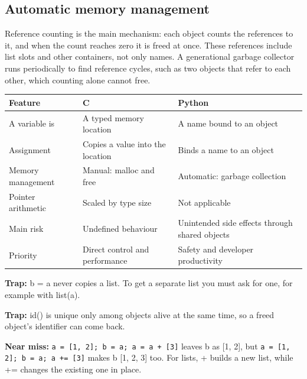 \documentclass[11pt]{article}
\begin{document}
\begin{keepsection}
\begin{keepsection}
\subsection{Automatic memory management}

Reference counting is the main mechanism: each object counts the references to it, and when the count reaches zero it is freed at once. These references include list slots and other containers, not only names. A generational garbage collector runs periodically to find reference cycles, such as two objects that refer to each other, which counting alone cannot free.

\begin{center}\small\begin{tabularx}{\linewidth}{>{\raggedright\arraybackslash}X>{\raggedright\arraybackslash}X>{\raggedright\arraybackslash}X}\toprule
\textbf{Feature} & \textbf{C} & \textbf{Python} \\ \midrule
A variable is & A typed memory location & A name bound to an object \\
Assignment & Copies a value into the location & Binds a name to an object \\
Memory management & Manual: malloc and free & Automatic: garbage collection \\
Pointer arithmetic & Scaled by type size & Not applicable \\
Main risk & Undefined behaviour & Unintended side effects through shared objects \\
Priority & Direct control and performance & Safety and developer productivity \\
\bottomrule\end{tabularx}\end{center}

\begin{notebox}\textbf{Trap:} b = a never copies a list. To get a separate list you must ask for one, for example with list(a).\end{notebox}

\begin{notebox}\textbf{Trap:} id() is unique only among objects alive at the same time, so a freed object’s identifier can come back.\end{notebox}

\begin{notebox}\textbf{Near miss:} \texttt{a = [1, 2]; b = a; a = a + [3]} leaves b as [1, 2], but \texttt{a = [1, 2]; b = a; a += [3]} makes b [1, 2, 3] too. For lists, + builds a new list, while += changes the existing one in place.\end{notebox}


\end{keepsection}
\end{keepsection}
\end{document}
